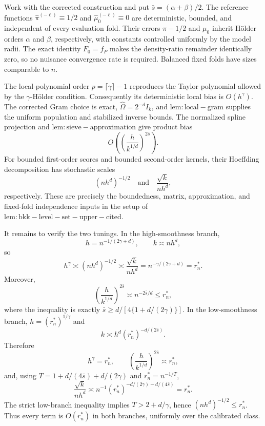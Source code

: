 Work with the corrected construction and put \(\bar s=(\alpha+\beta)/2\). The reference functions \(\widehat\pi^{(-\ell)}\equiv1/2\) and \(\widehat\mu_0^{(-\ell)}\equiv0\) are deterministic, bounded, and independent of every evaluation fold. Their errors \(\pi-1/2\) and \(\mu_0\) inherit Hölder orders \(\alpha\) and \(\beta\), respectively, with constants controlled uniformly by the model radii. The exact identity \(F_0=f_P\) makes the density-ratio remainder identically zero, so no nuisance convergence rate is required. Balanced fixed folds have sizes comparable to \(n\).

The local-polynomial order \(p=\lceil\gamma\rceil-1\) reproduces the Taylor polynomial allowed by the \(\gamma\)-Hölder condition. Consequently its deterministic local bias is \(O(h^\gamma)\). The corrected Gram choice is exact, \(\widehat\Omega=2^{-d}I_k\), and \(\mathrm{lem:local-gram}\) supplies the uniform population and stabilized inverse bounds. The normalized spline projection and \(\mathrm{lem:sieve-approximation}\) give product bias
\[
O\!\left(\left(\frac{h}{k^{1/d}}\right)^{2\bar s}\right).
\]
For bounded first-order scores and bounded second-order kernels, their Hoeffding decomposition has stochastic scales
\[
(nh^d)^{-1/2}
\quad\text{and}\quad
\frac{\sqrt{k}}{nh^d},
\]
respectively. These are precisely the boundedness, matrix, approximation, and fixed-fold independence inputs in the setup of \(\mathrm{lem:bkk-level-set-upper-cited}\).

It remains to verify the two tunings. In the high-smoothness branch,
\[
h=n^{-1/(2\gamma+d)},\qquad k\asymp nh^d,
\]
so
\[
h^\gamma\asymp(nh^d)^{-1/2}\asymp\frac{\sqrt{k}}{nh^d}=n^{-\gamma/(2\gamma+d)}=r_n^*.
\]
Moreover,
\[
\left(\frac h{k^{1/d}}\right)^{2\bar s}\asymp n^{-2\bar s/d}\le r_n^*,
\]
where the inequality is exactly \(\bar s\ge d/[4\{1+d/(2\gamma)\}]\). In the low-smoothness branch, \(h=(r_n^*)^{1/\gamma}\) and
\[
k\asymp h^d(r_n^*)^{-d/(2\bar s)}.
\]
Therefore
\[
h^\gamma=r_n^*,
\qquad
\left(\frac h{k^{1/d}}\right)^{2\bar s}\asymp r_n^*,
\]
and, using \(T=1+d/(4\bar s)+d/(2\gamma)\) and \(r_n^*=n^{-1/T}\),
\[
\frac{\sqrt{k}}{nh^d}
\asymp n^{-1}(r_n^*)^{-d/(2\gamma)-d/(4\bar s)}
=r_n^*.
\]
The strict low-branch inequality implies \(T>2+d/\gamma\), hence \((nh^d)^{-1/2}\le r_n^*\). Thus every term is \(O(r_n^*)\) in both branches, uniformly over the calibrated class.